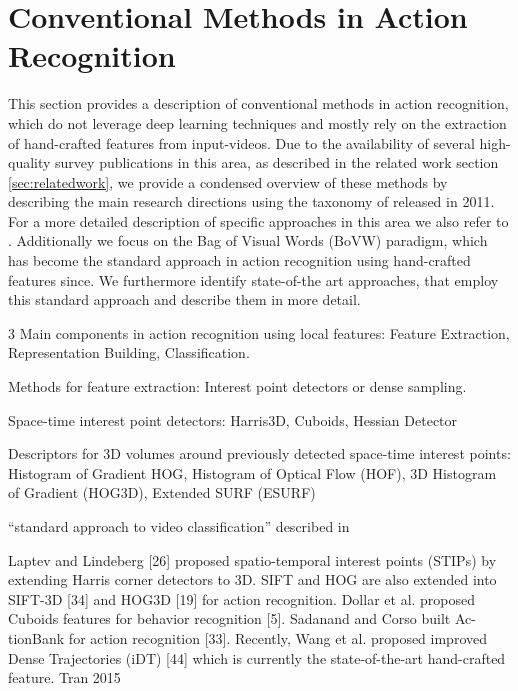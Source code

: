 \section{Conventional Methods in Action Recognition}

This section provides a description of conventional methods in action recognition, which do not leverage deep learning techniques and mostly rely on the extraction of hand-crafted features from input-videos.
Due to the availability of several high-quality survey publications in this area, as described in the related work section \ref{sec:relatedwork}, we provide a condensed overview of these methods by describing the main research directions using the taxonomy of \textcite{aggarwal_human_2011} released in 2011.
For a more detailed description of specific approaches in this area we also refer to \cite{aggarwal_human_2011}.
Additionally we focus on the Bag of Visual Words (BoVW) paradigm, which has become the standard approach in action recognition using hand-crafted features since.
We furthermore identify state-of-the art approaches, that employ this standard approach and describe them in more detail.


3 Main components in action recognition using local features: Feature Extraction, Representation Building, Classification.

Methods for feature extraction: Interest point detectors or dense sampling.

Space-time interest point detectors: Harris3D\cite{laptev_space-time_2005}, Cuboids\cite{dollar_behavior_2005}, Hessian Detector\cite{willems_efficient_2008}

Descriptors for 3D volumes around previously detected space-time interest points: Histogram of Gradient HOG\cite{dalal_histograms_2005-1}, Histogram of Optical Flow (HOF)\cite{laptev_learning_2008}, 3D Histogram of Gradient (HOG3D)\cite{klaser_spatio-temporal_2008}, Extended SURF (ESURF)\cite{willems_efficient_2008}

``standard approach to video classification'' described in \cite{karpathy_large-scale_2014}

Laptev and Lindeberg [26] proposed spatio-temporal interest points (STIPs)
by extending Harris corner detectors to 3D. SIFT and HOG
are also extended into SIFT-3D [34] and HOG3D [19] for
action recognition. Dollar et al. proposed Cuboids features
for behavior recognition [5]. Sadanand and Corso built Ac-
tionBank for action recognition [33]. Recently, Wang et al.
proposed improved Dense Trajectories (iDT) [44] which is
currently the state-of-the-art hand-crafted feature. Tran 2015

